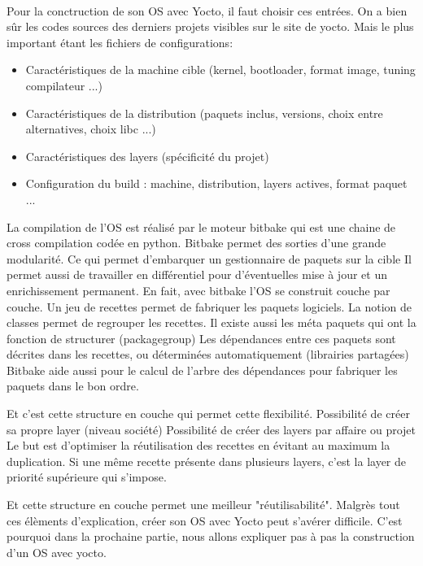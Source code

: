 \paragraph{}
Pour la conctruction de son OS avec Yocto, il faut choisir ces entrées.
On a bien sûr les codes sources des derniers projets visibles sur le site de yocto.
Mais le plus important étant les fichiers de configurations:
\begin{itemize} 

\item Caractéristiques de la machine cible (kernel, bootloader, format
image, tuning compilateur ...)
\item Caractéristiques de la distribution (paquets inclus, versions, choix
entre alternatives, choix libc ...)
\item Caractéristiques des layers (spécificité du projet)
\item Configuration du build : machine, distribution, layers actives, format
paquet ...

\end{itemize} 
La compilation de l'OS est réalisé par le moteur bitbake qui est une chaine de cross compilation codée en python.
Bitbake permet des sorties d'une grande modularité.
Ce qui permet d'embarquer un gestionnaire de paquets sur la cible
Il permet aussi  de travailler en différentiel pour d'éventuelles mise à jour et un enrichissement permanent.
En fait, avec bitbake l'OS se construit couche par couche.
Un jeu de recettes permet de fabriquer les paquets logiciels.
La notion de classes permet de regrouper les recettes.
Il existe aussi les méta paquets qui ont la fonction de structurer
(packagegroup)
Les dépendances entre ces paquets sont décrites dans les
recettes, ou déterminées automatiquement (librairies
partagées)
Bitbake aide aussi pour le calcul de l'arbre des dépendances pour fabriquer les
paquets dans le bon ordre.

Et c'est cette structure en couche qui permet cette flexibilité.
Possibilité de créer sa propre layer (niveau
société)
Possibilité de créer des layers par affaire ou
projet
Le but est d'optimiser la réutilisation des recettes
en évitant au maximum la duplication.
Si une même recette présente dans plusieurs
layers, c'est la layer de priorité supérieure qui
s'impose.

Et cette structure en couche permet une meilleur "réutilisabilité".
Malgrès tout ces élèments d'explication, créer son OS avec Yocto peut s'avérer difficile.
C'est pourquoi dans la prochaine partie, nous allons expliquer pas à pas la construction d'un OS avec yocto.
